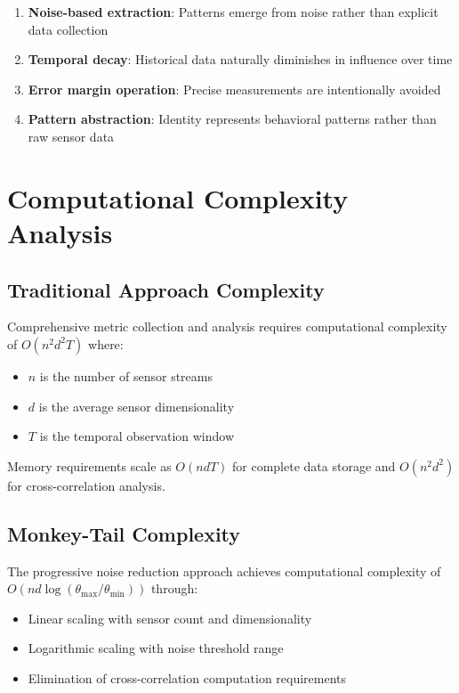 \documentclass[12pt,a4paper]{article}
\begin{document}
\begin{enumerate}
\item \textbf{Noise-based extraction}: Patterns emerge from noise rather than explicit data collection
\item \textbf{Temporal decay}: Historical data naturally diminishes in influence over time
\item \textbf{Error margin operation}: Precise measurements are intentionally avoided
\item \textbf{Pattern abstraction}: Identity represents behavioral patterns rather than raw sensor data
\end{enumerate}

\section{Computational Complexity Analysis}

\subsection{Traditional Approach Complexity}

Comprehensive metric collection and analysis requires computational complexity of $O(n^2 d^2 T)$ where:
\begin{itemize}
\item $n$ is the number of sensor streams
\item $d$ is the average sensor dimensionality
\item $T$ is the temporal observation window
\end{itemize}

Memory requirements scale as $O(ndT)$ for complete data storage and $O(n^2d^2)$ for cross-correlation analysis.

\subsection{Monkey-Tail Complexity}

The progressive noise reduction approach achieves computational complexity of $O(n d \log(\theta_{\text{max}}/\theta_{\text{min}}))$ through:

\begin{itemize}
\item Linear scaling with sensor count and dimensionality
\item Logarithmic scaling with noise threshold range
\item Elimination of cross-correlation computation requirements
\end{itemize}
\end{document}
